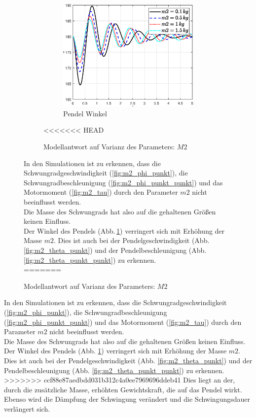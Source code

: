 \begin{figure}
\begin{figure}
\begin{subfigure}[b]{0.49\linewidth}
        \includegraphics[width=\linewidth]{Bilder/5_sensi/fig/m2/theta.eps}
        \caption{Pendel Winkel}
        \label{fig:m2_theta}
    \end{subfigure}
        \caption{Modellantwort auf Varianz des Parameters: $M2$}
        \label{fig:m2}
<<<<<<< HEAD
\end{figure}
In den Simulationen ist zu erkennen, dass die Schwungradgeschwindigkeit (\ref{fig:m2_phi_punkt}), die Schwungradbeschleunigung (\ref{fig:m2_phi_punkt_punkt}) und das Motormoment (\ref{fig:m2_tau}) durch den Parameter $m2$ nicht beeinflusst werden.\\
Die Masse des Schwungrads hat also auf die gehaltenen Größen keinen Einfluss.\\

Der Winkel des Pendels (Abb.\,\ref{fig:m2_theta}) verringert sich mit Erhöhung der Masse $m2$. 
Dies ist auch bei der Pendelgeschwindigkeit (Abb.\,\ref{fig:m2_theta_punkt}) und der Pendelbeschleunigung (Abb.\,\ref{fig:m2_theta_punkt_punkt}) zu erkennen.\\
=======
\end{figure}
In den Simulationen ist zu erkennen, dass die Schwungradgeschwindigkeit (\ref{fig:m2_phi_punkt}), die Schwungradbeschleunigung (\ref{fig:m2_phi_punkt_punkt}) und das Motormoment (\ref{fig:m2_tau}) durch den Parameter $m2$ nicht beeinflusst werden.\\
Die Masse des Schwungrads hat also auf die gehaltenen Größen keinen Einfluss.\\

Der Winkel des Pendels (Abb. \ref{fig:m2_theta}) verringert sich mit Erhöhung der Masse $m2$. 
Dies ist auch bei der Pendelgeschwindigkeit (Abb. \ref{fig:m2_theta_punkt}) und der Pendelbeschleunigung (Abb. \ref{fig:m2_theta_punkt_punkt}) zu erkennen.\\
>>>>>>> ccf88e87aedbdd031b312c4a0ee7969696ddeb41
Dies liegt an der, durch die zusätzliche Masse, erhöhten Gewichtskraft, die auf das Pendel wirkt.\\
Ebenso wird die Dämpfung der Schwingung verändert und die Schwingungsdauer verlängert sich.\\


